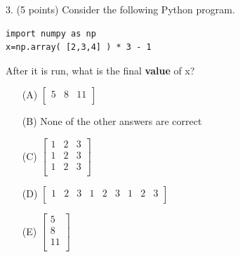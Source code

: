 \documentclass{article}
\begin{document}
\noindent
\begin{minipage}{\textwidth}
3. (5 points)
Consider the following Python program.
\begin{verbatim}
import numpy as np
x=np.array( [2,3,4] ) * 3 - 1
\end{verbatim}
After it is run, what is the final \textbf{value} of x?

\begin{enumerate}
\item[(A)]
$ \left[ \begin{array}{ccc} 5 & 8 & 11 \\ \end{array} \right] $

\item[(B)]
None of the other answers are correct

\item[(C)]
$ \left[ \begin{array}{ccc} 1 & 2 & 3 \\ 1 & 2 & 3  \\ 1 & 2 & 3  \\ \end{array} \right] $

\item[(D)]
$ \left[ \begin{array}{ccccccccc} 1 & 2 & 3 & 1 & 2 & 3 & 1 & 2 & 3 \\ \end{array} \right] $

\item[(E)]
$ \left[ \begin{array}{c} 5 \\ 8 \\ 11 \\ \end{array} \right] $

\end{enumerate}
\end{minipage}
\vspace{10em}
\filbreak\vfil{}\vfilneg
\end{document}
